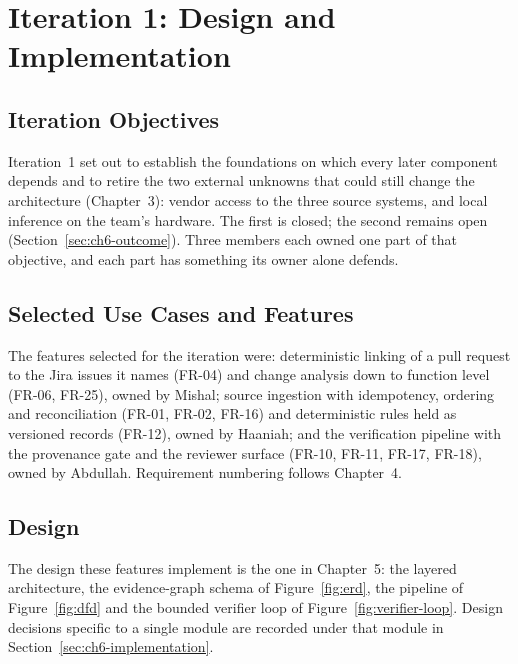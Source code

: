 \chapter{Iteration 1: Design and Implementation}
\section{Iteration Objectives}

Iteration~1 set out to establish the foundations on which every later component
depends and to retire the two external unknowns that could still change the
architecture (Chapter~3): vendor access to the three source systems, and local
inference on the team's hardware. The first is closed; the second remains open
(Section~\ref{sec:ch6-outcome}). Three members each owned one part of that
objective, and each part has something its owner alone defends.

\section{Selected Use Cases and Features}

The features selected for the iteration were: deterministic linking of a pull
request to the Jira issues it names (FR-04) and change analysis down to
function level (FR-06, FR-25), owned by Mishal; source ingestion with
idempotency, ordering and reconciliation (FR-01, FR-02, FR-16) and deterministic
rules held as versioned records (FR-12), owned by Haaniah; and the verification
pipeline with the provenance gate and the reviewer surface (FR-10, FR-11,
FR-17, FR-18), owned by Abdullah. Requirement numbering follows Chapter~4.

\section{Design}

The design these features implement is the one in Chapter~5: the layered
architecture, the evidence-graph schema of Figure~\ref{fig:erd}, the pipeline of
Figure~\ref{fig:dfd} and the bounded verifier loop of
Figure~\ref{fig:verifier-loop}. Design decisions specific to a single module are
recorded under that module in Section~\ref{sec:ch6-implementation}.

